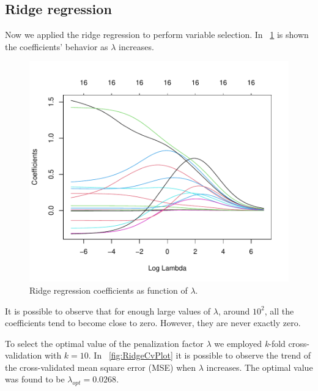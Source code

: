 \subsection{Ridge regression}

Now we applied the ridge regression to perform variable selection. In \Fig~\ref{fig:RidgeCoefVsLambda} is shown the coefficients' behavior as $\lambda$ increases. 

\begin{figure}[h]
	\centering
	\includegraphics[width=0.4\linewidth]{ImageFiles/Regression/Ridge/RidgeCoefVsLambda.pdf}
	\caption{Ridge regression coefficients as function of $\lambda$.}
	\label{fig:RidgeCoefVsLambda}
\end{figure}

It is possible to observe that for enough large values of $\lambda$, around $10^2$, all the coefficients tend to become close to zero. However, they are never exactly zero.

To select the optimal value of the penalization factor $\lambda$ we employed \textit{k}-fold cross-validation with $\textit{k}=10$. In \Fig~\ref{fig:RidgeCvPlot} it is possible to observe the trend of the cross-validated mean square error (MSE) when $\lambda$ increases. The optimal value was found to be $\lambda_{opt} = 0.0268$.

